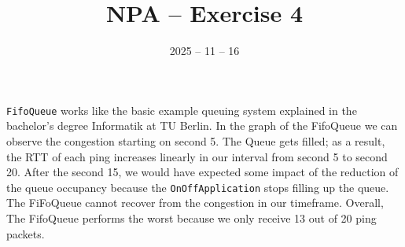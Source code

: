 \documentclass{article}
\date{2025 -- 11 -- 16}
\title{NPA -- Exercise 4}
\begin{document}
\maketitle

    \section{}
    \setcounter{subsection}{4}
    \subsection{}

    
    \texttt{FifoQueue} works like the basic example queuing system explained in the bachelor's degree Informatik at TU Berlin. 
    In the graph of the FifoQueue we can observe the congestion starting on second 5. 
    The Queue gets filled; as a result, the RTT of each ping increases linearly in our interval from second 5 to second 20. 
    After the second 15, we would have expected some impact of the reduction of the queue occupancy because the \texttt{OnOffApplication} stops filling up the queue. The FiFoQueue cannot recover from the congestion in our timeframe.
      Overall, The FifoQueue performs the worst because we only receive 13 out of 20 ping packets.  
    
\end{document}
